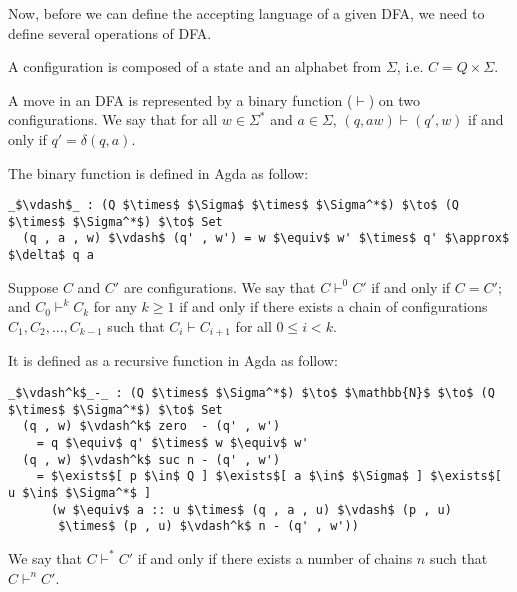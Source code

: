 \par Now, before we can define the accepting language of a given
DFA, we need to define several operations of DFA. 

\begin{defn}
\noindent A configuration is composed of a state and an alphabet from
\(\Sigma\), i.e. \(C = Q \times \Sigma\). 
\end{defn}

\begin{defn}
\noindent A move in an DFA is
represented by a binary function (\(\vdash\)) on two configurations. We say
that for all \(w \in \Sigma^*\) and \(a \in \Sigma\), \((q, aw)
\vdash (q' , w)\) if and only if \(q' = \delta (q , a)\). 
\end{defn}

\par The binary function is defined in Agda as follow: 
\begin{lstlisting}[mathescape=true,xleftmargin=.1\textwidth]
  _$\vdash$_ : (Q $\times$ $\Sigma$ $\times$ $\Sigma^*$) $\to$ (Q $\times$ $\Sigma^*$) $\to$ Set
  (q , a , w) $\vdash$ (q' , w') = w $\equiv$ w' $\times$ q' $\approx$ $\delta$ q a
\end{lstlisting}

\begin{defn}
\noindent Suppose \(C\) and \(C'\) are configurations. We say that \(C \vdash^0 C'\) if and only
if \(C = C'\); and \(C_0 \vdash^k C_k\) for any \(k \geq 1\) if and only if there exists a chain of
configurations \(C_1, C_2, ..., C_{k-1}\) such that \(C_i \vdash C_{i+1}\) for all \(0 \leq i < k\). 
\end{defn}

\par It is defined as a recursive function in Agda as follow: 
\begin{lstlisting}[mathescape=true,xleftmargin=.1\textwidth]
  _$\vdash^k$_-_ : (Q $\times$ $\Sigma^*$) $\to$ $\mathbb{N}$ $\to$ (Q $\times$ $\Sigma^*$) $\to$ Set
  (q , w) $\vdash^k$ zero  - (q' , w')
    = q $\equiv$ q' $\times$ w $\equiv$ w'
  (q , w) $\vdash^k$ suc n - (q' , w') 
    = $\exists$[ p $\in$ Q ] $\exists$[ a $\in$ $\Sigma$ ] $\exists$[ u $\in$ $\Sigma^*$ ]
      (w $\equiv$ a :: u $\times$ (q , a , u) $\vdash$ (p , u) 
       $\times$ (p , u) $\vdash^k$ n - (q' , w'))
\end{lstlisting}

\begin{defn}
\noindent We say that \(C \vdash^* C'\) if and only
if there exists a number of chains \(n\) such that \(C \vdash^n C'\). 
\end{defn}

